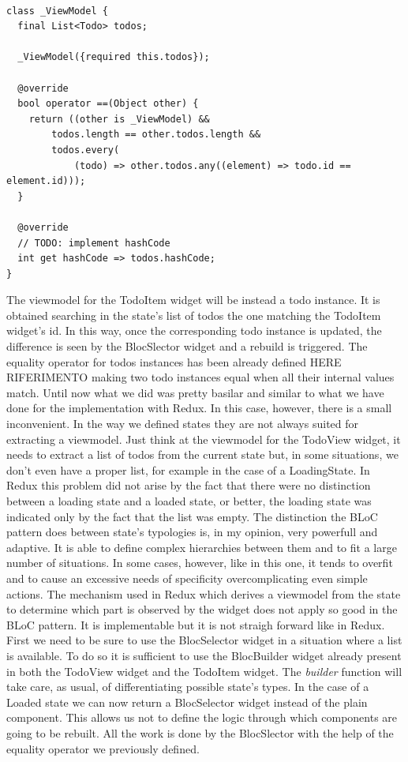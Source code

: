 \begin{code}
\mbox{}\\
 \mbox{}
\label{code:2.14}
\begin{verbatim}
class _ViewModel {
  final List<Todo> todos;

  _ViewModel({required this.todos});

  @override
  bool operator ==(Object other) {
    return ((other is _ViewModel) &&
        todos.length == other.todos.length &&
        todos.every(
            (todo) => other.todos.any((element) => todo.id == element.id)));
  }

  @override
  // TODO: implement hashCode
  int get hashCode => todos.hashCode;
}
\end{verbatim}
\end{code}
The viewmodel for the TodoItem widget will be instead a todo instance. It is obtained searching in the state's list of todos the one matching the TodoItem widget's id. In this way, once the corresponding todo instance is updated, the difference is seen by the BlocSlector widget and  a rebuild is triggered. The equality operator for todos instances has been already defined  HERE RIFERIMENTO making two todo instances equal when all their internal values match. Until now what we did was pretty basilar and similar to what we have done for the implementation with Redux. In this case, however, there is a small inconvenient. In the way we defined states they are not always suited for extracting a viewmodel. Just think at the viewmodel for the TodoView widget, it needs to extract a list of todos from the current state but, in some situations, we don't even have a proper list, for example in the case of a LoadingState. In Redux this problem did not arise by the fact that there were no distinction between a loading state and a loaded state, or better, the loading state was indicated only by the fact that the list was empty. The distinction the BLoC pattern does between state's typologies is, in my opinion, very powerfull and adaptive. It is able to define complex hierarchies between them and to fit a large number of situations. In some cases, however, like in this one, it tends to overfit and to cause an excessive needs of specificity overcomplicating even simple actions. The mechanism used in Redux which derives a viewmodel from the state to determine which part is observed by the widget does not apply so good in the BLoC pattern. It is implementable but it is not straigh forward like in Redux. First we need to be sure to use the BlocSelector widget in a situation where a list is available. To do so it is sufficient to use the BlocBuilder widget already present in both the TodoView widget and the TodoItem widget. The \textit{builder} function will take care, as usual, of differentiating possible state's types. In the case of a Loaded state we can now return a BlocSelector widget instead of the plain component. This allows us not to define the logic through which  components are going to be rebuilt. All the work is done by the BlocSlector with the help of the equality operator we previously defined.
